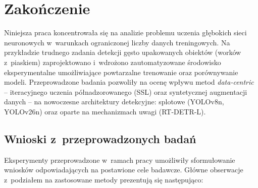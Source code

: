\chapter{Zakończenie}

Niniejsza praca koncentrowała się na analizie problemu uczenia głębokich sieci neuronowych w~warunkach ograniczonej liczby danych treningowych. Na przykładzie trudnego zadania detekcji gęsto upakowanych obiektów (worków z~piaskiem) zaprojektowano i~wdrożono zautomatyzowane środowisko eksperymentalne umożliwiające powtarzalne trenowanie oraz porównywanie modeli. Przeprowadzone badania pozwoliły na ocenę wpływu metod \textit{data-centric} -- iteracyjnego uczenia półnadzorowanego (SSL) oraz syntetycznej augmentacji danych -- na nowoczesne architektury detekcyjne: splotowe (YOLOv8n, YOLOv26n) oraz oparte na mechanizmach uwagi (RT-DETR-L).

\section{Wnioski z~przeprowadzonych badań}

Eksperymenty przeprowadzone w~ramach pracy umożliwiły sformułowanie wniosków odpowiadających na postawione cele badawcze. Główne obserwacje z~podziałem na zastosowane metody prezentują się następująco:

